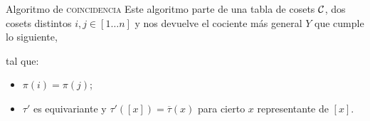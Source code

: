\documentclass[aspectratio=169, 9pt]{beamer}
\newcommand{\rep}{\textsc{rep}}
\newcommand{\coin}{\textsc{coincidencia}}
\newcommand{\In}{[1 \dots n]}
\newcommand{\ol}{\overline}
\newcommand{\Co}{{\cal{C}}}
\begin{document}
\begin{frame}[fragile]{Algoritmo de \coin}
	Este algoritmo parte de una tabla de cosets $\Co$, dos cosets distintos $i,j \in \In$ y nos devuelve el cociente más general $Y$ que cumple lo siguiente,
		\begin{center}
					{\large {}}
		\end{center}
	\pause
		tal que:
		\begin{itemize}
			\item $\pi(i) = \pi(j)$;
			\item $\tau'$ es equivariante y $\tau' ([x]) = \ol\tau(x)$ para cierto $x$ representante de  $[x]$. 
		\end{itemize}
\end{frame}
%
%	
\end{document}
